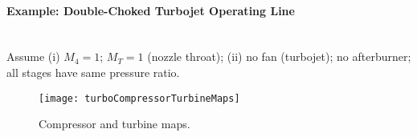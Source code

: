 \paragraph{Example: Double-Choked Turbojet Operating Line}  \mbox{}\\[0.5em]
Assume (i) $M_4 = 1$; $M_T = 1$ (nozzle throat); (ii) no fan (turbojet); no afterburner; all stages have same pressure ratio.

\begin{figure}[!htb!]
 \centering
    {\texttt{[image: turboCompressorTurbineMaps]}}
    \caption{\label{fig:compressorTurbineMaps}Compressor and turbine maps.}
\end{figure}

